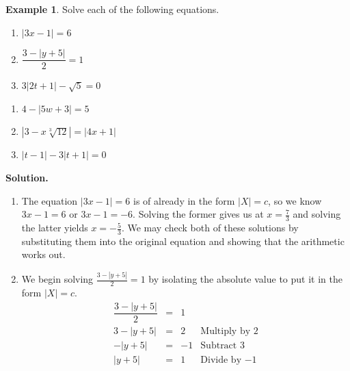 \documentclass[11pt]{article}
\theoremstyle{definition}  %
\newtheorem{ex}{\bf Example}
\newcounter{HW}
\begin{document}
\begin{ex} \label{absvalueeqnex}  Solve each of the following equations.

\begin{multicols}{3}
\begin{enumerate}

\item  $|3x-1| = 6$
\item  $\dfrac{3 - |y+5|}{2} = 1$
\item  $3|2t+1| - \sqrt{5} = 0$

\setcounter{HW}{\value{enumi}}
\end{enumerate}
\end{multicols}

\begin{multicols}{3}
\begin{enumerate}
\setcounter{enumi}{\value{HW}}

\item  $4 - |5w+3| = 5$

\item  $\left|3 - x \sqrt[3]{12}\right| = |4x+1|$

\item  $|t-1| - 3|t+1| = 0$


\end{enumerate}
\end{multicols}

{\bf Solution.} 

\begin{enumerate}

\item  The equation  $|3x-1| = 6$ is of already in the form $|X| = c$, so we know  $3x-1=6$ or $3x-1 = -6$.  Solving the former gives us at $x = \frac{7}{3}$ and solving the latter yields $x = -\frac{5}{3}$.  We may check both of these solutions by substituting them into the original equation and showing that the arithmetic works out.

\item  We begin solving  $\frac{3 - |y+5|}{2} = 1$ by isolating the absolute value to put it in the form $|X| = c$.\[ \begin{array}{rclr}
\dfrac{3 - |y+5|}{2} & = & 1 &  \\
3 - |y+5| & = & 2 & \text{Multiply by $2$}\\
-|y+5| & = & -1 & \text{Subtract $3$} \\
|y+5| & = & 1 & \text{Divide by $-1$}  \\ 


\end{array}\]
\end{enumerate}
\end{ex}
\end{document}
